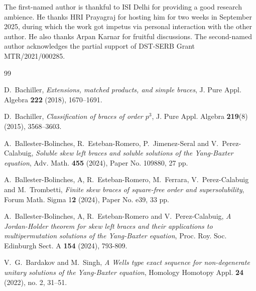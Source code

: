 \documentclass[11pt]{amsart}
\theoremstyle{thrm}
\theoremstyle{plain}
\theoremstyle{definition}
\numberwithin{equation}{section}
\begin{document}
 The first-named author is thankful to ISI Delhi for providing a good research ambience. He thanks HRI Prayagraj for hosting him for two weeks in September 2025, during which the work got impetus via personal interaction with the other author. He also thanks Arpan Karnar for  fruitful discussions. The second-named author acknowledges the partial support of DST-SERB Grant MTR/2021/000285. 



\begin{thebibliography}{99}	
	
	 D.~Bachiller, \textit{Extensions, matched products, and simple braces}, J. Pure Appl. Algebra \textbf{222} (2018), 1670--1691.
	
	 D.~Bachiller, \textit{Classification of braces of order $p^3$}, J. Pure Appl. Algebra \textbf{219}(8) (2015), 3568--3603.
	

	
	A.~Ballester-Bolinches,  R.~Esteban-Romero, P.~Jimenez-Seral and V.~Perez-Calabuig, 
	\textit{ Soluble skew left braces and soluble solutions of the Yang-Baxter equation}, 
Adv. Math. \textbf{455} (2024), Paper No. 109880, 27 pp.

A.~Ballester-Bolinches, A, R.~Esteban-Romero, M.~Ferrara, V.~Perez-Calabuig and M.~Trombetti,
\textit{Finite skew braces of square-free order and supersolubility}, 
Forum Math. Sigma 1\textbf{2} (2024), Paper No. e39, 33 pp.

A.~Ballester-Bolinches, A, R.~Esteban-Romero and V.~Perez-Calabuig,
 \emph{A Jordan-Holder theorem for skew left braces and their applications to multipermutation solutions of the Yang-Baxter equation},
Proc. Roy. Soc. Edinburgh Sect. A {\bf 154} (2024), 793-809.

	
	 V.~G.~Bardakov and M.~Singh, \textit{ A Wells type exact sequence for non-degenerate unitary solutions of the Yang-Baxter equation}, Homology Homotopy Appl. \textbf{24} (2022), no. 2, 31--51.
	

\end{thebibliography}
\end{document}
